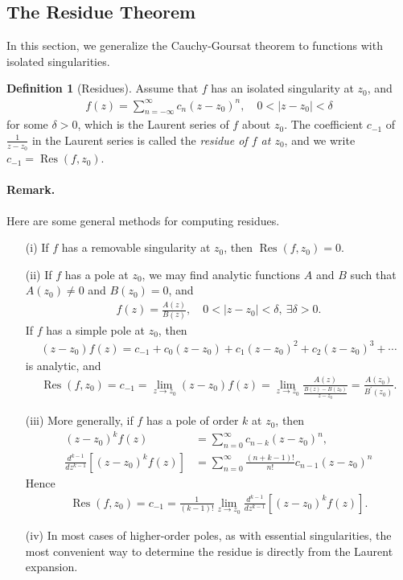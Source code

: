 \documentclass{article}
\numberwithin{equation}{section}
\DeclareMathOperator{\res}{Res}
\theoremstyle{plain}
\theoremstyle{definition}
\newtheorem{definition}[theorem]{Definition}
\begin{document}
\subsection{The Residue Theorem}
In this section, we generalize the Cauchy-Goursat theorem to functions
with isolated singularities.
\begin{definition}[Residues]
Assume that $f$ has an isolated singularity at $z_0$, and
\begin{align*}
	f(z)=\sum_{n=-\infty}^\infty c_n(z-z_0)^n,\quad 0<\vert z-z_0\vert <\delta
\end{align*}
for some $\delta>0$, which is the Laurent series of $f$ about $z_0$. The coefficient $c_{-1}$ of $\frac{1}{z-z_0}$ in the Laurent series is called the \textit{residue of $f$ at $z_0$}, and we write $c_{-1}=\res(f,z_0)$.
\end{definition}
\paragraph{Remark.} Here are some general methods for computing residues.
\begin{itemize}
\item[(i)] If $f$ has a removable singularity at $z_0$, then $\res(f,z_0)=0$.
\item[(ii)] If $f$ has a pole at $z_0$, we may find analytic functions $A$ and $B$ such that $A(z_0)\neq 0$ and $B(z_0)=0$, and
\begin{align*}
	f(z)=\frac{A(z)}{B(z)},\quad 0<\vert z-z_0\vert<\delta,\ \exists\delta>0.
\end{align*}
If $f$ has a simple pole at $z_0$, then
\begin{align*}
	(z-z_0)f(z)=c_{-1}+c_0(z-z_0)+c_1(z-z_0)^2+c_2(z-z_0)^3+\cdots
\end{align*}
is analytic, and
\begin{align*}
	\res(f,z_0)=c_{-1}=\lim_{z\to z_0}(z-z_0)f(z)=\lim_{z\to z_0}\frac{A(z)}{\frac{B(z)-B(z_0)}{z-z_0}}=\frac{A(z_0)}{B^\prime(z_0)}.
\end{align*}
\item[(iii)] More generally, if $f$ has a pole of order $k$ at $z_0$, then
\begin{align*}
	(z-z_0)^k f(z)&=\sum_{n=0}^\infty c_{n-k}(z-z_0)^n,\\
	\frac{d^{k-1}}{dz^{k-1}}\left[(z-z_0)^k f(z)\right]&=\sum_{n=0}^\infty \frac{(n+k-1)!}{n!}c_{n-1}(z-z_0)^n
\end{align*}
Hence
\begin{align*}
	\res(f,z_0)=c_{-1}=\frac{1}{(k-1)!}\lim_{z\to z_0}\frac{d^{k-1}}{dz^{k-1}}\left[(z-z_0)^k f(z)\right].
\end{align*}
\item[(iv)] In most cases of higher-order poles, as with essential singularities, the most convenient way to determine the residue is directly from the Laurent expansion.
\end{itemize} 
\end{document}

